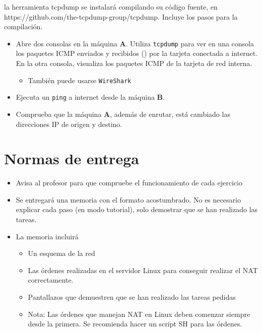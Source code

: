 \begin{homeworkProblem}

          {\vspace{-1cm}\noindent\fontsize{.1}{.1}\selectfont la herramienta tcpdump se instalará compilando su código fuente, en https://github.com/the-tcpdump-group/tcpdump. Incluye los pasos para la compilación.\vspace{-.5cm}}
  
  \begin{itemize}
  \item Abre dos consolas en la máquina \textbf{A}. Utiliza \texttt{tcpdump} para ver en una consola los paquetes ICMP enviados y recibidos () por la tarjeta conectada a internet. En la otra consola, visualiza los paquetes ICMP de la tarjeta de red interna.
    \begin{itemize}
    \item También puede usarse \texttt{WireShark}
    \end{itemize}
  \item Ejecuta un \texttt{ping} a internet desde la máquina \textbf{B}.
  \item Comprueba que la máquina \textbf{A}, además de enrutar, está cambiado las direcciones IP de origen y destino.
  \end{itemize}

  
\end{homeworkProblem}


\section{Normas de entrega}
\begin{itemize}
\item Avisa al profesor para que compruebe el funcionamiento de cada ejercicio 
\item Se entregará una memoria con el formato acostumbrado. No es necesario explicar cada paso (en modo tutorial), solo demostrar que se han realizado las tareas.
\item La memoria incluirá

  \begin{itemize}
  \item Un esquema de la red 
  \item Las órdenes realizadas en el servidor Linux para conseguir realizar el NAT correctamente.
  \item Pantallazos que demuestren que se han realizado las tareas pedidas
  \item
    \begin{small}
      Nota: Las órdenes que manejan NAT en Linux deben comenzar siempre desde la primera. Se recomienda hacer un script SH para las órdenes.
    \end{small}
    
  \end{itemize}

\end{itemize}


